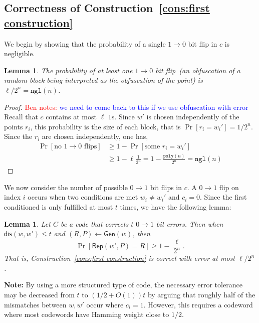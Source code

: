 \documentclass[11pt]{article}
\newcommand{\consref}[1]{\mbox{Construction~\ref{#1}}}
\newcommand{\class}[1]{{\ensuremath{\mathsf{#1}}}}
\newcommand{\gen}{\ensuremath{\class{Gen}}\xspace}
\newcommand{\rep}{\ensuremath{\class{Rep}}\xspace}
\newcommand{\dis}{\ensuremath{\mathsf{dis}}}
\newcommand{\poly}{\ensuremath{\mathtt{poly}}\xspace}
\newcommand{\ngl}{\ensuremath{\mathtt{ngl}}\xspace}
\newtheorem{lemma}[theorem]{Lemma}
\newcommand{\authnote}[2]{{\textcolor{red}{\textsf{#1 notes: }\textcolor{blue}{ #2}}\marginpar{\textcolor{red}{\textbf{!!!!!}}}}}
\newcommand{\authnote}[2]{}
\newcommand{\bnote}[1]{{\authnote{Ben}{#1}}}
\begin{document}
\subsection{Correctness of \consref{cons:first construction}}
We begin by showing that the probability of a single $1\rightarrow 0$ bit flip in $c$ is negligible.
\begin{lemma}
\label{lem:no 1 to 0 flips}
The probability of at least one $1\rightarrow 0$ bit flip~(an obfuscation of a random block being interpreted as the obfuscation of the point) is $ \ell/2^n = \ngl(n)$.
\end{lemma}
\begin{proof}
\bnote{we need to come back to this if we use obfuscation with error}
Recall that $c$ contains at most $\ell$ $1$s.  Since $w'$ is chosen independently of the points $r_i$, this probability is the size of each block, that is $\Pr[r_i =w_i']  = 1/2^n$. Since the $r_i$ are chosen independently, one has,
\begin{align*}
\Pr[\text{no $1\rightarrow 0$ flips}] &\geq 1-\Pr[\text{some }r_i = w_i']\\
&\geq 1-\ell \frac{1}{2^n} = 1-\frac{\poly(n)}{2^n} = \ngl(n)
\end{align*}
\end{proof}

We now consider the number of possible $0\rightarrow 1$ bit flips in $c$.  A $0\rightarrow 1$ flip on index $i$ occurs when two conditions are met $w_i\neq w_i'$ and $c_i = 0$.  Since the first conditioned is only fulfilled at most $t$ times, we have the following lemma:

\begin{lemma}
Let $C$ be a code that corrects $t$ $0\rightarrow 1$ bit errors.  Then when $\dis(w, w')\leq t$ and $(R, P)\leftarrow \gen(w)$, then 
\[
\Pr[\rep( w', P) = R] \geq 1-\frac{\ell}{2^n}.
\]
That is, \consref{cons:first construction} is correct with error at most $\ell/2^n$.
\end{lemma}

\textbf{Note: }By using a more structured type of code, the necessary error tolerance may be decreased from $t$ to  $(1/2+O(1))t$ by arguing that roughly half of the mismatches between $w, w'$ occur where $c_i =1$.  However, this requires a codeword where most codewords have Hamming weight close to $1/2$.
\end{document}
